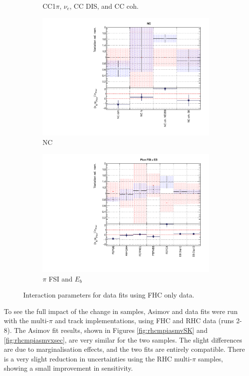 \begin{figure}
\begin{subfigure}{0.49\textwidth}
  \caption{CC1$\pi$, $\nu_e$, CC DIS, and CC coh.}
  \label{fig:}
\end{subfigure}
\begin{subfigure}{0.49\textwidth}
  \centering
  \includegraphics[width=0.95\linewidth]{figs/rhcmpdatxsec248_3}
  \caption{NC}
  \label{fig:}
\end{subfigure}
\begin{subfigure}{0.49\textwidth}
  \centering
  \includegraphics[width=0.95\linewidth]{figs/rhcmpdatxsec248_4}
  \caption{$\pi$ FSI and $E_b$}
  \label{fig:}
\end{subfigure}
\caption{Interaction parameters for data fits using FHC only data.}
\label{fig:rhcmpidat248xsec}
\end{figure}

To see the full impact of the change in samples, Asimov and data fits were run with the multi-$\pi$ and track implementations, using FHC and RHC data (runs 2-8). The Asimov fit results, shown in Figures \ref{fig:rhcmpiasmvSK} and \ref{fig:rhcmpiasmvxsec}, are very similar for the two samples. The slight differences are due to marginalisation effects, and the two fits are entirely compatible. There is a very slight reduction in uncertainties using the RHC multi-$\pi$ samples, showing a small improvement in sensitivity.

